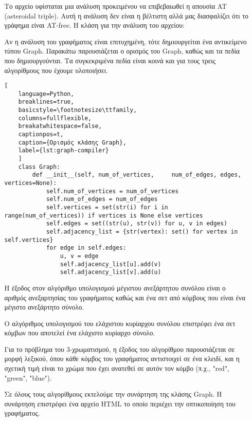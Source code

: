 Το αρχείο υφίσταται μια ανάλυση προκειμένου να επιβεβαιωθεί η απουσία AT (asteroidal triple). Αυτή η ανάλυση δεν είναι η βέλτιστη αλλά μας διασφαλίζει ότι το γράφημα είναι AT-free. Η κλάση για την ανάλυση του αρχείου:





Αν η ανάλυση του γραφήματος είναι επιτυχημένη, τότε δημιουργείται ένα αντικείμενο τύπου Graph. Παρακάτω παρουσιάζεται ο ορισμός του Graph, καθώς και τα πεδία που δημιουργούνται. Τα συγκεκριμένα πεδία είναι κοινά και για τους τρεις αλγορίθμους που έχουμε υλοποιήσει. 

  

\begin{lstlisting}[
	language=Python,
	breaklines=true,
	basicstyle=\footnotesize\ttfamily,
	columns=fullflexible,
	breakatwhitespace=false,
	captionpos=t,
	caption={Ορισμός κλάσης Graph},
	label={lst:graph-compiler}
	]
	class Graph:
		def __init__(self, num_of_vertices, 	num_of_edges, edges, vertices=None):
			self.num_of_vertices = num_of_vertices
			self.num_of_edges = num_of_edges
			self.vertices = set(str(i) for i in range(num_of_vertices)) if vertices is None else vertices
			self.edges = set((str(u), str(v)) for u, v in edges)
			self.adjacency_list = {str(vertex): set() for vertex in self.vertices}
			for edge in self.edges:
				u, v = edge
				self.adjacency_list[u].add(v)
				self.adjacency_list[v].add(u)
\end{lstlisting}


Η έξοδος στον αλγόριθμο υπολογισμού μέγιστου ανεξάρτητου συνόλου
είναι ο αριθμός ανεξαρτησίας του γραφήματος καθώς και ένα σετ από κόμβους που είναι ένα μέγιστο ανεξάρτητο σύνολο. 


Ο αλγόριθμος υπολογισμού του ελάχιστου κυρίαρχου συνόλου επιστρέφει ένα σετ κόμβων που αποτελεί ένα ελάχιστο κυρίαρχο σύνολο.  

Για το πρόβλημα του 3-χρωματισμού, η έξοδος του αλγορίθμου παρουσιάζεται σε μορφή λεξικού, όπου κάθε κόμβος του γραφήματος αντιστοιχεί σε ένα κλειδί, και η σχετική τιμή είναι το χρώμα που έχει ανατεθεί σε αυτόν τον κόμβο (π.χ., "red", "green", "blue").

Σε όλους τους αλγορίθμους εκτελούμε την συνάρτηση  της κλάσης Graph. Η συνάρτηση επιστρέφει ένα αρχείο HTML το οποίο περιέχει την οπτικοποίηση του γραφήματος.

